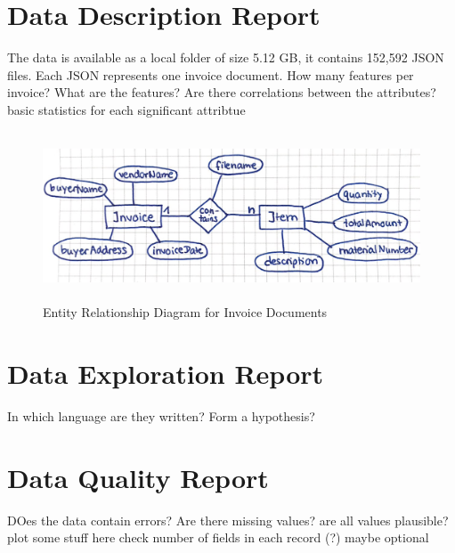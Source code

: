 \section{Data Description Report}
The data is available as a local folder of size 5.12 GB, it contains 152,592 \ac{JSON} files. Each \ac{JSON} represents one invoice document. 
How many features per invoice?
What are the features?
Are there correlations between the attributes?
basic statistics for each significant attribtue

\begin{figure}[ht]
	\centering
	\includegraphics[height=5cm]{Bilder/practical/entity_relationship.png}
	\caption{Entity Relationship Diagram for Invoice Documents}
	\label{fig:er}
\end{figure}

\section{Data Exploration Report}
In which language are they written?
Form a hypothesis?

\section{Data Quality Report}
DOes the data contain errors?
Are there missing values?
are all values plausible?
plot some stuff here
check number of fields in each record (?) maybe optional
